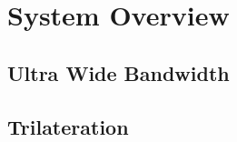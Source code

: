 

\setcounter{section}{1}
\section{System Overview}
\bigskip



\subsection{Ultra Wide Bandwidth}




\subsection{Trilateration}




